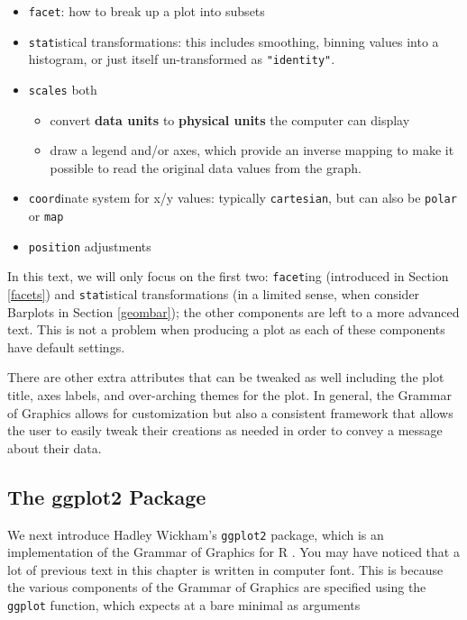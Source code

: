 \documentclass[]{tufte-book}
\providecommand{\tightlist}{%
  \setlength{\itemsep}{0pt}\setlength{\parskip}{0pt}}
\theoremstyle{definition}
\theoremstyle{definition}
\theoremstyle{remark}
\begin{document}
\begin{itemize}
\tightlist
\item
  \texttt{facet}: how to break up a plot into subsets
\item
  \texttt{stat}istical transformations: this includes smoothing, binning
  values into a histogram, or just itself un-transformed as
  \texttt{"identity"}.
\item
  \texttt{scales} both

  \begin{itemize}
  \tightlist
  \item
    convert \textbf{data units} to \textbf{physical units} the computer
    can display
  \item
    draw a legend and/or axes, which provide an inverse mapping to make
    it possible to read the original data values from the graph.
  \end{itemize}
\item
  \texttt{coord}inate system for x/y values: typically
  \texttt{cartesian}, but can also be \texttt{polar} or \texttt{map}
\item
  \texttt{position} adjustments
\end{itemize}

In this text, we will only focus on the first two: \texttt{facet}ing
(introduced in Section \ref{facets}) and \texttt{stat}istical
transformations (in a limited sense, when consider Barplots in Section
\ref{geombar}); the other components are left to a more advanced text.
This is not a problem when producing a plot as each of these components
have default settings.

There are other extra attributes that can be tweaked as well including
the plot title, axes labels, and over-arching themes for the plot. In
general, the Grammar of Graphics allows for customization but also a
consistent framework that allows the user to easily tweak their
creations as needed in order to convey a message about their data.

\subsection{The ggplot2 Package}\label{the-ggplot2-package}

We next introduce Hadley Wickham's \texttt{ggplot2} package, which is an
implementation of the Grammar of Graphics for R \citep{R-ggplot2}. You
may have noticed that a lot of previous text in this chapter is written
in computer font. This is because the various components of the Grammar
of Graphics are specified using the \texttt{ggplot} function, which
expects at a bare minimal as arguments
\end{document}
